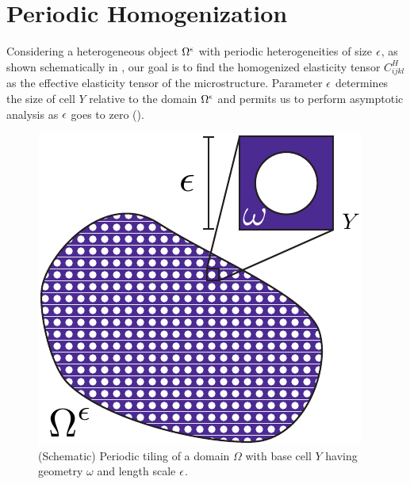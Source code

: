 \documentclass[twocolumn,10pt]{article}
\begin{document}
\section{Periodic Homogenization}
Considering a heterogeneous object $\Omega^\epsilon$ with periodic
heterogeneities of size $\epsilon$, as shown schematically in
, our goal is to find the homogenized elasticity
tensor $C^H_{ijkl}$ as the effective elasticity tensor of the
microstructure. Parameter $\epsilon$ determines the size of cell $Y$
relative to the domain $\Omega^\epsilon$ and permits us to perform
asymptotic analysis as $\epsilon$ goes to zero ().
\begin{figure}[!hbt]
    \centering
    \includegraphics[width=.28\textwidth]{Images/periodic.pdf}
    \caption{(Schematic) Periodic tiling of a domain $\Omega$ with
      base cell $Y$ having geometry $\omega$ and length scale $\epsilon$.}
    \label{fig:periodic}
\end{figure}
\end{document}

